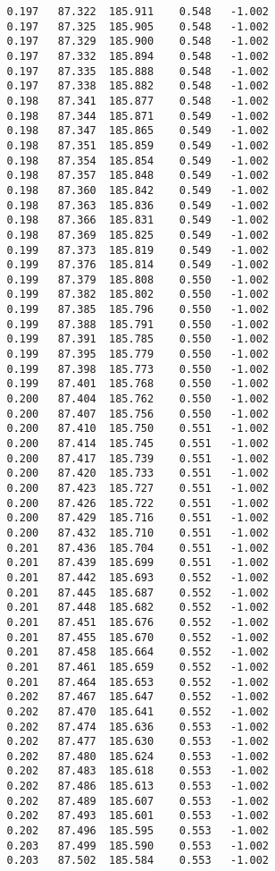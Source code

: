 \begin{verbatim}
   0.197   87.322  185.911    0.548   -1.002
   0.197   87.325  185.905    0.548   -1.002
   0.197   87.329  185.900    0.548   -1.002
   0.197   87.332  185.894    0.548   -1.002
   0.197   87.335  185.888    0.548   -1.002
   0.197   87.338  185.882    0.548   -1.002
   0.198   87.341  185.877    0.548   -1.002
   0.198   87.344  185.871    0.549   -1.002
   0.198   87.347  185.865    0.549   -1.002
   0.198   87.351  185.859    0.549   -1.002
   0.198   87.354  185.854    0.549   -1.002
   0.198   87.357  185.848    0.549   -1.002
   0.198   87.360  185.842    0.549   -1.002
   0.198   87.363  185.836    0.549   -1.002
   0.198   87.366  185.831    0.549   -1.002
   0.198   87.369  185.825    0.549   -1.002
   0.199   87.373  185.819    0.549   -1.002
   0.199   87.376  185.814    0.549   -1.002
   0.199   87.379  185.808    0.550   -1.002
   0.199   87.382  185.802    0.550   -1.002
   0.199   87.385  185.796    0.550   -1.002
   0.199   87.388  185.791    0.550   -1.002
   0.199   87.391  185.785    0.550   -1.002
   0.199   87.395  185.779    0.550   -1.002
   0.199   87.398  185.773    0.550   -1.002
   0.199   87.401  185.768    0.550   -1.002
   0.200   87.404  185.762    0.550   -1.002
   0.200   87.407  185.756    0.550   -1.002
   0.200   87.410  185.750    0.551   -1.002
   0.200   87.414  185.745    0.551   -1.002
   0.200   87.417  185.739    0.551   -1.002
   0.200   87.420  185.733    0.551   -1.002
   0.200   87.423  185.727    0.551   -1.002
   0.200   87.426  185.722    0.551   -1.002
   0.200   87.429  185.716    0.551   -1.002
   0.200   87.432  185.710    0.551   -1.002
   0.201   87.436  185.704    0.551   -1.002
   0.201   87.439  185.699    0.551   -1.002
   0.201   87.442  185.693    0.552   -1.002
   0.201   87.445  185.687    0.552   -1.002
   0.201   87.448  185.682    0.552   -1.002
   0.201   87.451  185.676    0.552   -1.002
   0.201   87.455  185.670    0.552   -1.002
   0.201   87.458  185.664    0.552   -1.002
   0.201   87.461  185.659    0.552   -1.002
   0.201   87.464  185.653    0.552   -1.002
   0.202   87.467  185.647    0.552   -1.002
   0.202   87.470  185.641    0.552   -1.002
   0.202   87.474  185.636    0.553   -1.002
   0.202   87.477  185.630    0.553   -1.002
   0.202   87.480  185.624    0.553   -1.002
   0.202   87.483  185.618    0.553   -1.002
   0.202   87.486  185.613    0.553   -1.002
   0.202   87.489  185.607    0.553   -1.002
   0.202   87.493  185.601    0.553   -1.002
   0.202   87.496  185.595    0.553   -1.002
   0.203   87.499  185.590    0.553   -1.002
   0.203   87.502  185.584    0.553   -1.002

\end{verbatim}
